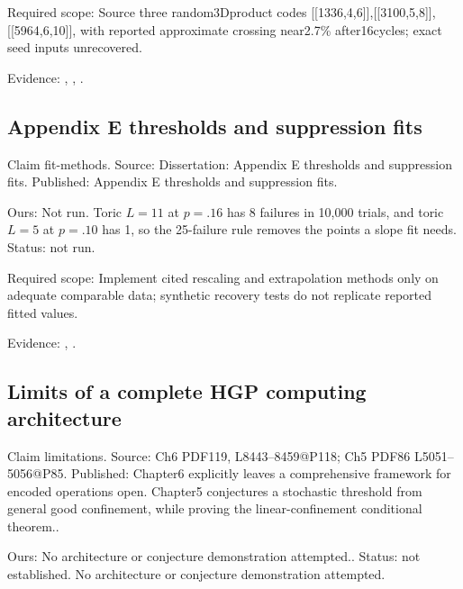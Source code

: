 Required scope: Source three random3Dproduct codes [[1336,4,6]],[[3100,5,8]],[[5964,6,10]], with reported approximate crossing near2.7\% after16cycles; exact seed inputs unrecovered.

Evidence: \href{https://github.com/alectionary/vibe-math/blob/master/formalization/quintavalle-hgp/sources/browser-extraction.txt}{}, \href{https://github.com/alectionary/vibe-math/blob/master/formalization/quintavalle-hgp/availability.md}{}, \href{https://github.com/alectionary/vibe-math/blob/master/formalization/quintavalle-hgp/results/original_pilots.json}{}.
\subsection{Appendix E thresholds and suppression fits}\label{claim:fit-methods}
Claim fit-methods. Source: Dissertation: Appendix E thresholds and suppression fits. Published: Appendix E thresholds and suppression fits.

Ours: Not run. Toric $L=11$ at $p=.16$ has 8 failures in 10,000 trials, and toric $L=5$ at $p=.10$ has 1, so the 25-failure rule removes the points a slope fit needs. Status: not run.

Required scope: Implement cited rescaling and extrapolation methods only on adequate comparable data; synthetic recovery tests do not replicate reported fitted values.

Evidence: \href{https://github.com/alectionary/vibe-math/blob/master/formalization/quintavalle-hgp/sources/browser-extraction.txt}{}, \href{https://github.com/alectionary/vibe-math/blob/master/formalization/quintavalle-hgp/availability.md}{}.
\subsection{Limits of a complete HGP computing architecture}\label{claim:limitations}
Claim limitations. Source: Ch6 PDF119, L8443--8459@P118; Ch5 PDF86 L5051--5056@P85. Published: Chapter6 explicitly leaves a comprehensive framework for encoded operations open. Chapter5 conjectures a stochastic threshold from general good confinement, while proving the linear-confinement conditional theorem..

Ours: No architecture or conjecture demonstration attempted.. Status: not established. No architecture or conjecture demonstration attempted.

